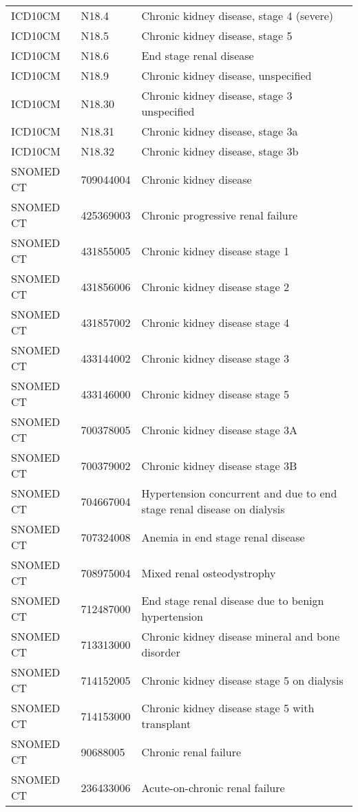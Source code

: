 \begin{longtable}{p{}p{}p{}}
  ICD10CM & N18.4 & Chronic kidney disease, stage 4 (severe) \\ 
  ICD10CM & N18.5 & Chronic kidney disease, stage 5 \\ 
  ICD10CM & N18.6 & End stage renal disease \\ 
  ICD10CM & N18.9 & Chronic kidney disease, unspecified \\ 
  ICD10CM & N18.30 & Chronic kidney disease, stage 3 unspecified \\ 
  ICD10CM & N18.31 & Chronic kidney disease, stage 3a \\ 
  ICD10CM & N18.32 & Chronic kidney disease, stage 3b \\ 
  SNOMED CT & 709044004 & Chronic kidney disease \\ 
  SNOMED CT & 425369003 & Chronic progressive renal failure \\ 
  SNOMED CT & 431855005 & Chronic kidney disease stage 1 \\ 
  SNOMED CT & 431856006 & Chronic kidney disease stage 2 \\ 
  SNOMED CT & 431857002 & Chronic kidney disease stage 4 \\ 
  SNOMED CT & 433144002 & Chronic kidney disease stage 3 \\ 
  SNOMED CT & 433146000 & Chronic kidney disease stage 5 \\ 
  SNOMED CT & 700378005 & Chronic kidney disease stage 3A \\ 
  SNOMED CT & 700379002 & Chronic kidney disease stage 3B \\ 
  SNOMED CT & 704667004 & Hypertension concurrent and due to end stage renal disease on dialysis \\ 
  SNOMED CT & 707324008 & Anemia in end stage renal disease \\ 
  SNOMED CT & 708975004 & Mixed renal osteodystrophy \\ 
  SNOMED CT & 712487000 & End stage renal disease due to benign hypertension \\ 
  SNOMED CT & 713313000 & Chronic kidney disease mineral and bone disorder \\ 
  SNOMED CT & 714152005 & Chronic kidney disease stage 5 on dialysis \\ 
  SNOMED CT & 714153000 & Chronic kidney disease stage 5 with transplant \\ 
  SNOMED CT & 90688005 & Chronic renal failure \\ 
  SNOMED CT & 236433006 & Acute-on-chronic renal failure \\ 

\end{longtable}
